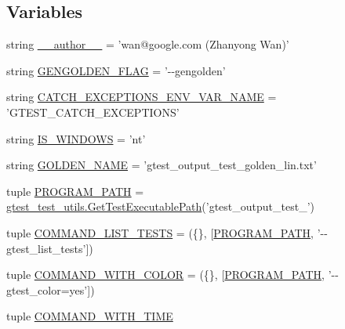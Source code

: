 \subsection*{Variables}
\begin{DoxyCompactItemize}
\item 
string \hyperlink{namespacegtest__output__test_a9549d664d25c13351c08bfe88072f5cf}{\-\_\-\-\_\-author\-\_\-\-\_\-} = 'wan@google.\-com (Zhanyong Wan)'
\item 
string \hyperlink{namespacegtest__output__test_a25addad68fc28461f31e7f473bb7643f}{G\-E\-N\-G\-O\-L\-D\-E\-N\-\_\-\-F\-L\-A\-G} = '-\/-\/gengolden'
\item 
string \hyperlink{namespacegtest__output__test_a3b2d61497a354f214b5a086dcff420ee}{C\-A\-T\-C\-H\-\_\-\-E\-X\-C\-E\-P\-T\-I\-O\-N\-S\-\_\-\-E\-N\-V\-\_\-\-V\-A\-R\-\_\-\-N\-A\-M\-E} = 'G\-T\-E\-S\-T\-\_\-\-C\-A\-T\-C\-H\-\_\-\-E\-X\-C\-E\-P\-T\-I\-O\-N\-S'
\item 
string \hyperlink{namespacegtest__output__test_a76e823e0e56e3c25aa8b0aab4431f763}{I\-S\-\_\-\-W\-I\-N\-D\-O\-W\-S} = 'nt'
\item 
string \hyperlink{namespacegtest__output__test_a317ece7d11d9103a7bdbf0320b64a981}{G\-O\-L\-D\-E\-N\-\_\-\-N\-A\-M\-E} = 'gtest\-\_\-output\-\_\-test\-\_\-golden\-\_\-lin.\-txt'
\item 
tuple \hyperlink{namespacegtest__output__test_a091d7c2220b9da215ddfa38130aaa49a}{P\-R\-O\-G\-R\-A\-M\-\_\-\-P\-A\-T\-H} = \hyperlink{namespacegtest__test__utils_a1bdf3cac86afa675ed37629b183048e9}{gtest\-\_\-test\-\_\-utils.\-Get\-Test\-Executable\-Path}('gtest\-\_\-output\-\_\-test\-\_\-')
\item 
tuple \hyperlink{namespacegtest__output__test_ad57de209fb07e1002c8a929dd8a15dc9}{C\-O\-M\-M\-A\-N\-D\-\_\-\-L\-I\-S\-T\-\_\-\-T\-E\-S\-T\-S} = (\{\}, \mbox{[}\hyperlink{namespacegtest__output__test_a091d7c2220b9da215ddfa38130aaa49a}{P\-R\-O\-G\-R\-A\-M\-\_\-\-P\-A\-T\-H}, '-\/-\/gtest\-\_\-list\-\_\-tests'\mbox{]})
\item 
tuple \hyperlink{namespacegtest__output__test_adbeb34904b377333d8168d1b54584b53}{C\-O\-M\-M\-A\-N\-D\-\_\-\-W\-I\-T\-H\-\_\-\-C\-O\-L\-O\-R} = (\{\}, \mbox{[}\hyperlink{namespacegtest__output__test_a091d7c2220b9da215ddfa38130aaa49a}{P\-R\-O\-G\-R\-A\-M\-\_\-\-P\-A\-T\-H}, '-\/-\/gtest\-\_\-color=yes'\mbox{]})
\item 
tuple \hyperlink{namespacegtest__output__test_a1c27d93a57990d21461436f2d5ff3064}{C\-O\-M\-M\-A\-N\-D\-\_\-\-W\-I\-T\-H\-\_\-\-T\-I\-M\-E}
\item 

\end{DoxyCompactItemize}
